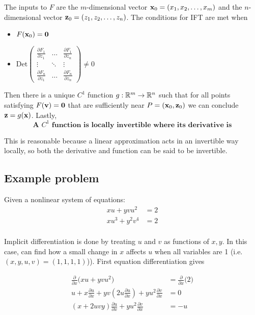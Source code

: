 The inputs to $F$ are the $m$-dimensional vector $\textbf x_0=(x_1,x_2,\ldots,x_m)$ and the $n$-dimensional vector $\textbf z_0=(z_1,z_2,\ldots, z_n)$.
The conditions for IFT are met when
\begin{itemize}
    \item $F(\textbf x_0)=\textbf 0$
    \item $\mbox{Det}\left(
        \begin{matrix}
        \frac{\partial F_1}{\partial z_1}&\dots&\frac{\partial F_1}{\partial z_n}\\
        \vdots&\ddots&\vdots\\
        \frac{\partial F_n}{\partial z_1}&\dots&\frac{\partial F_n}{\partial z_n}
        \end{matrix}
        \right)\neq 0$
\end{itemize}

Then there is a unique $C^1$ function $g:\mathbb{R}^m\to \mathbb{R}^n$ such that for all points satisfying $F(\textbf v)=\textbf 0$ that are sufficiently near $P=(\textbf x_0,\textbf z_0)$ we can conclude $\textbf z=g(\textbf x)$. Lastly,
\[\boxed{\textbf{A $C^1$ function is locally invertible where its derivative is}}\]

This is reasonable because a linear approximation acts in an invertible way locally, so both the derivative and function can be said to be invertible.

\subsection{Example problem}

Given a nonlinear system of equations:
\begin{align*}
    xu+yvu^2&=2\\
    xu^3+y^2v^4&=2\\
\end{align*}

Implicit differentiation is done by treating $u$ and $v$ as functions of $x,y$. In this case,
can find how a small change in $x$ affects $u$ when all variables are 1 (i.e. $(x,y,u,v)=(1,1,1,1)$)).
First equation differentiation gives 

\begin{align*}
    \frac{\partial }{\partial x}\Big(xu+yvu^2\Big)&=\frac{\partial }{\partial x}
    \Big(2\Big)\\
    u+x\frac{\partial u}{\partial x}+yv\left(2u\frac{\partial u}{\partial x}\right)+yu^2\frac{\partial v}{\partial x}&=0\\
    (x+2uvy)\frac{\partial u}{\partial x}+yu^2\frac{\partial v}{\partial x}&=-u
\end{align*}


